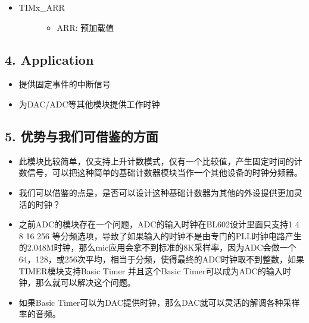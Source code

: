 \documentclass[letterpaper,10pt,english]{sphinxmanual}
\begin{document}
\begin{itemize}
\begin{description}
\begin{itemize}
\end{itemize}

\end{description}

\item {} \begin{description}
\item[{TIMx\_ARR}] \leavevmode\begin{itemize}
\item {} 
ARR: 预加载值

\end{itemize}

\end{description}

\end{itemize}


\subsection{4. Application}
\label{\detokenize{STM32_u5b9a_u65f6_u5668_u8bbe_u8ba1_u4ecb_u7ecd/STM32_u7684_u5b9a_u65f6_u5668_u8bbe_u8ba1_u4ecb_u7ecd:application}}\begin{itemize}
\item {} 
提供固定事件的中断信号

\item {} 
为DAC/ADC等其他模块提供工作时钟

\end{itemize}


\subsection{5. 优势与我们可借鉴的方面}
\label{\detokenize{STM32_u5b9a_u65f6_u5668_u8bbe_u8ba1_u4ecb_u7ecd/STM32_u7684_u5b9a_u65f6_u5668_u8bbe_u8ba1_u4ecb_u7ecd:id1}}\begin{itemize}
\item {} 
此模块比较简单，仅支持上升计数模式，仅有一个比较值，产生固定时间的计数信号，可以把这种简单的基础计数器模块当作一个其他设备的时钟分频器。

\item {} 
我们可以借鉴的点是，是否可以设计这种基础计数器为其他的外设提供更加灵活的时钟？

\item {} 
之前ADC的模块存在一个问题，ADC的输入时钟在BL602设计里面只支持1 4 8 16 256 等分频选项，导致了如果输入的时钟不是由专门的PLL时钟电路产生的2.048M时钟，那么mic应用会拿不到标准的8K采样率，因为ADC会做一个64，128，或256次平均，相当于分频，使得最终的ADC时钟取不到整数，如果TIMER模块支持Basic Timer 并且这个Basic Timer可以成为ADC的输入时钟，那么就可以解决这个问题。

\item {} 
如果Basic Timer可以为DAC提供时钟，那么DAC就可以灵活的解调各种采样率的音频。

\end{itemize}
\end{document}
